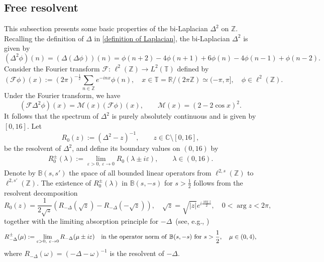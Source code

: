 \documentclass[reqno, 11pt]{amsart}
\newcommand\R{\mathbb{R}}
\newcommand\Z{\mathbb{Z}}
\newcommand\B{\mathbb{B}}
\newcommand\C{\mathbb{C}}
\newcommand\T{\mathbb{T}}
\newcommand\mcaF{\mathcal{F}}
\newcommand\mcaM{\mathcal{M}}
\numberwithin{equation}{section}
\begin{document}
\subsection{Free resolvent}\label{Subsec of free resol}
This subsection presents some basic properties of the  bi-Laplacian $\Delta^2$ on $\Z$. 
Recalling the definition of $\Delta$ in \eqref{definition of Laplacian}, the bi-Laplacian $\Delta^2$ is given by 
\begin{equation*}
(\Delta^2\phi)(n)=(\Delta(\Delta\phi))(n)=\phi(n+2)-4\phi(n+1)+6\phi(n)-4\phi(n-1)+\phi(n-2).
\end{equation*}
Consider the Fourier transform $\mcaF$: $\ell^2(\Z)\rightarrow L^2(\T)$ defined by
\begin{equation}\label{fourier transform}
(\mcaF\phi)(x):=(2\pi)^{-{\frac{1}{2}}}\sum_{n\in\Z}^{}e^{-inx}\phi(n), \quad x\in\T=\R/(2\pi\Z)\simeq(-\pi,\pi],\quad  \phi\in\ell^2(\Z).
\end{equation}
Under the Fourier transform, we have
\begin{equation}\label{unitary equivalent}
(\mcaF\Delta^2\phi)(x)=\mcaM(x)(\mcaF\phi)(x),\qquad \mcaM(x)=(2-2 \cos x)^2.
\end{equation}
It follows that the spectrum of $\Delta^2$ is purely absolutely
continuous and is given by $[0,16]$.
Let
  $$R_0(z):=(\Delta^2-z)^{-1},\qquad z\in\C\setminus[0,16],$$
  be the resolvent of $\Delta^2$, and define its boundary values on $(0,16)$ by
  \begin{align*}
  R^{\pm}_{0}(\lambda):=\lim\limits_{\varepsilon>0,\ \varepsilon\rightarrow0 }R_{0}(\lambda\pm i\varepsilon ),\qquad\lambda\in(0,16).
  \end{align*}
   Denote by $\B(s,s')$ the space of all bounded linear operators from $\ell^{2,s}(\Z)$ to $\ell^{2,s'}(\Z)$. The existence of $R^{\pm}_0(\lambda)$ in  $\B(s,-s)$ for $s>\frac{1}{2}$ follows from the resolvent decomposition
\begin{equation}\label{unity partition}
 R_0(z)=\frac{1}{2\sqrt z}\left(R_{-\Delta}(\sqrt z)-R_{-\Delta}(-\sqrt z)\right),\quad\sqrt{z}=\sqrt{|z|}e^{i\frac{\arg z}{2}},\quad  0<\arg z<2\pi,
 \end{equation}
together with the limiting absorption principle for $-\Delta$~(see, e.g., \cite[Lemma 3.1]{KKK06})
  $$R^{\pm}_{-\Delta}(\mu):=\lim\limits_{\varepsilon>0,\ \varepsilon\rightarrow0}R_{-\Delta}(\mu\pm i\varepsilon )\quad {\rm in\ the\ operator\ norm\ of }\ \B(s,-s)\ {\rm for}\ s>\frac{1}{2},\quad \mu\in(0,4),$$
where $R_{-\Delta}(\omega)=(-\Delta-\omega)^{-1}$ is the resolvent of $-\Delta$.
\end{document}
